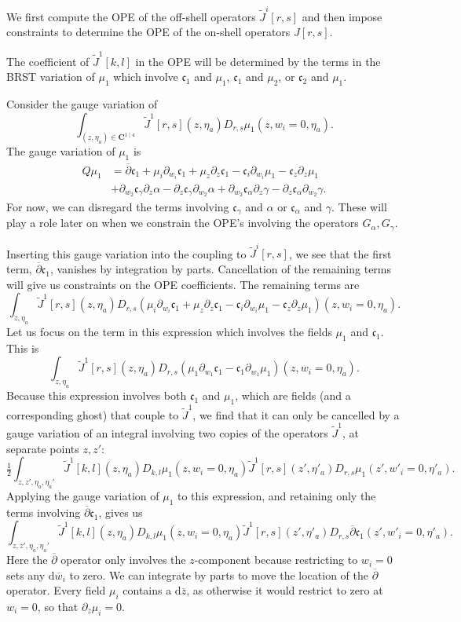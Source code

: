 \documentclass[11pt]{amsart}
\newcommand{\dbar}{\br{\partial}}
\newcommand{\wbar}{\br{w}}
\newcommand{\zbar}{\br{z}}
\newcommand{\til}{\widetilde}
\newcommand{\br}{\overline}
\newcommand{\C}{\mathbf C}
\newcommand{\mf}{\mathfrak}
\renewcommand{\d}{\mathrm{d}}
\theoremstyle{thm}
\numberwithin{equation}{subsection}
\theoremstyle{def}
\theoremstyle{rem}
\newcommand{\fc}{\mf{c}}
\begin{document}
We first compute the OPE of the off-shell operators $\til{J}^i[r,s]$ and then impose constraints to determine the OPE of the on-shell operators $J[r,s]$.

The coefficient of $\til{J}^1[k,l]$ in the OPE will be determined by the terms in the BRST variation of $\mu_1$ which involve $\fc_1$ and $\mu_1$, $\fc_1$ and $\mu_2$, or $\fc_2$ and $\mu_1$. 

Consider the gauge variation of 
\begin{equation}\label{eqn:j1vary}
	\int_{(z,\eta_a) \in \C^{1 \mid 4}} \til{J}^1[r,s](z,\eta_a)  D_{r,s} \mu_1(z,w_i = 0,\eta_a) . 
\end{equation}
The gauge variation of $\mu_1$ is
\begin{align*}
	Q \mu_1 & = \dbar \mf{c}_1 + \mu_i \partial_{w_i} \mf{c}_1 + \mu_z \partial_{z} \mf{c}_1 - \mf{c}_i \partial_{w_i} \mu_1 - \mf{c}_z \partial_z \mu_1 \\
& + \partial_{w_2} \fc_\gamma\partial_z \alpha -  \partial_z\fc_\gamma \partial_{w_2} \alpha + \partial_{w_2} \fc_\alpha \partial_z \gamma - \partial_z \fc_\alpha \partial_{w_2} \gamma .
\end{align*}
For now, we can disregard the terms involving $\fc_\gamma$ and $\alpha$ or $\fc_\alpha$ and $\gamma$.
These will play a role later on when we constrain the OPE's involving the operators $G_\alpha, G_\gamma$.

Inserting this gauge variation into the coupling to $\til{J}^i[r,s]$, we see that the first term, $\dbar \mf{c}_1$, vanishes by integration by parts.  Cancellation of the remaining terms will give us constraints on the OPE coefficients.
The remaining terms are 
\[ 
	\int_{z,\eta_a} \til{J}^1[r,s] (z,\eta_a)  D_{r,s}\left( \mu_i \partial_{w_i} \mf{c}_1 + \mu_z \partial_{z} \mf{c}_1 - \mf{c}_i \partial_{w_i} \mu_1 - \mf{c}_z \partial_z \mu_1 \right)(z,w_i = 0, \eta_a). 
\]
Let us focus on the term in this expression which involves the fields $\mu_1$ and $\mf{c}_1$. This is 
\[ 
	 \int_{z,\eta_a} \til{J}^1[r,s] (z,\eta_a)  D_{r,s}\left( \mu_1 \partial_{w_1} \mf{c}_1   - \mf{c}_1 \partial_{w_1} \mu_1  \right)(z,w_i = 0, \eta_a). 
\]
Because this expression involves both $\mf{c}_1$ and $\mu_1$, which are fields (and a corresponding ghost) that couple to $\til{J}^1$, we find that it can only be cancelled by a gauge variation of an integral involving two copies of the operators $\til{J}^1$, at separate points $z,z'$:  
\[ 
	\tfrac{1}{2} \int_{z,z', \eta_a,\eta_a'} \til{J}^1[k,l] (z,\eta_a) D_{k,l} \mu_1(z, w_i = 0, \eta_a)  \til{J}^1[r,s] (z',\eta'_a) D_{r,s} \mu_1(z', w'_i = 0, \eta'_a) . 
\]
Applying the gauge variation of $\mu_1$ to this expression, and retaining only the terms involving $\dbar \mf{c}_1$, gives us
\[ 
	\int_{z,z', \eta_a,\eta_a'} \til{J}^1[k,l] (z,\eta_a) D_{k,l} \mu_1(z, w_i = 0, \eta_a)  \til{J}^1[r,s] (z',\eta'_a) D_{r,s} \dbar \mf{c}_1 (z', w'_i = 0, \eta'_a) . 
\]
Here the $\dbar$ operator only involves the $z$-component because restricting to $w_i= 0$ sets any $\d \wbar_i$ to zero. We can integrate by parts to move the location of the $\dbar$ operator. Every field $\mu_i$ contains a $\d \zbar$, as otherwise it would restrict to zero at $w_i = 0$, so that $\partial_{\zbar} \mu_i = 0$. 
\end{document}
